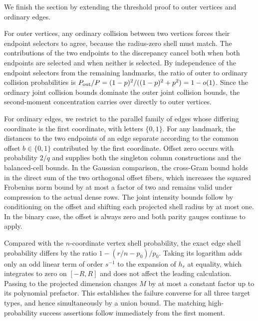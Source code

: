 We finish the section by extending the threshold proof to outer vertices and ordinary edges.

For outer vertices, any ordinary collision between two vertices forces their endpoint selectors to agree, because the radius-zero shell must match. The contributions of the two endpoints to the discrepancy cancel both when both endpoints are selected and when neither is selected. By independence of the endpoint selectors from the remaining landmarks, the ratio of outer to ordinary collision probabilities is \(P_{\rm out}/P=(1-p)^2/((1-p)^2+p^2)=1-o(1)\). Since the ordinary joint collision bounds dominate the outer joint collision bounds, the second-moment concentration carries over directly to outer vertices.

For ordinary edges, we restrict to the parallel family of edges whose differing coordinate is the first coordinate, with letters \(\{0,1\}\). For any landmark, the distances to the two endpoints of an edge separate according to the common offset \(b\in\{0,1\}\) contributed by the first coordinate. Offset zero occurs with probability \(2/q\) and supplies both the singleton column constructions and the balanced-cell bounds. In the Gaussian comparison, the cross-Gram bound holds in the direct sum of the two orthogonal offset fibers, which increases the squared Frobenius norm bound by at most a factor of two and remains valid under compression to the actual dense rows. The joint intensity bounds follow by conditioning on the offset and shifting each projected shell radius by at most one. In the binary case, the offset is always zero and both parity gauges continue to apply.

Compared with the \(n\)-coordinate vertex shell probability, the exact edge shell probability differs by the ratio \(1-(r/n-p_0)/p_0\). Taking its logarithm adds only an odd linear term of order \(s^{-1}\) to the expansion of \(h_r\) at equality, which integrates to zero on \([-R,R]\) and does not affect the leading calculation. Passing to the projected dimension changes \(M\) by at most a constant factor up to its polynomial prefactor. This establishes the failure converse for all three target types, and hence simultaneously by a union bound. The matching high-probability success assertions follow immediately from the first moment.
